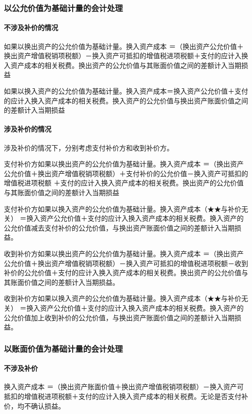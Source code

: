 \documentclass[UTF8,12pt]{ctexart}
\numberwithin{equation}{section} %
\numberwithin{figure}{section}
\numberwithin{table}{section}
\begin{document}
	\subsubsection{以公允价值为基础计量的会计处理}
	\paragraph{不涉及补价的情况}
	如果以换出资产的公允价值为基础计量。换入资产成本
	＝（换出资产公允价值＋换出资产增值税销项税额）－换入资产可抵扣的增值税进项税额＋支付的应计入换入资产成本的相关税费。换出资产的公允价值与其账面价值之间的差额计入当期损益
	
	如果以换入资产的公允价值为基础计量。换入资产成本＝换入资产公允价值＋支付的应计入换入资产成本的相关税费。换入资产的公允价值与换出资产账面价值之间的差额计入当期损益
	
	\paragraph{涉及补价的情况}
	涉及补价的情况下，分别考虑支付补价方和收到补价方。
	
	支付补价方如果以换出资产的公允价值为基础计量。换入资产成本
	＝（换出资产公允价值＋换出资产增值税销项税额）＋支付补价的公允价值－换入资产可抵扣的增值税进项税额
	＋支付的应计入换入资产成本的相关税费。换出资产的公允价值与其账面价值之间的差额计入当期损益
	
	支付补价方如果以换入资产的公允价值为基础计量。换入资产成本（★★与补价无关）
	＝换入资产公允价值＋支付的应计入换入资产成本的相关税费。换入资产的公允价值减去支付补价的公允价值，与换出资产账面价值之间的差额计入当期损益。
	
	收到补价方如果以换出资产的公允价值为基础计量。换入资产成本
	＝（换出资产公允价值＋换出资产增值税销项税额）－换入资产可抵扣的增值税进项税额－收到补价的公允价值＋支付的应计入换入资产成本的相关税费。换出资产的公允价值与其账面价值之间的差额计入当期损益。
	
	收到补价方如果以换入资产的公允价值为基础计量。换入资产成本（★★与补价无关）
	＝换入资产公允价值＋支付的应计入换入资产成本的相关税费。换入资产的公允价值加上收到补价的公允价值，与换出资产账面价值之间的差额计入当期损益。
	
	
	
	
	\subsubsection{以账面价值为基础计量的会计处理}
	\paragraph{不涉及补价}
	换入资产成本
	＝（换出资产账面价值＋换出资产增值税销项税额）－换入资产可抵扣的增值税进项税额＋支付的应计入换入资产成本的相关税费。无论是否支付补价，均不确认损益。
	
\end{document}
